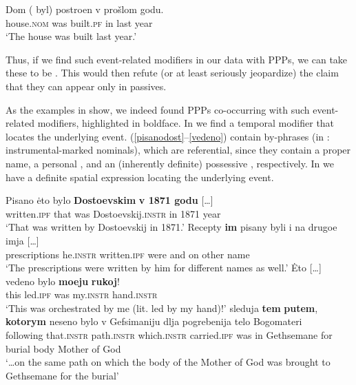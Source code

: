 \documentclass[output=paper,modfonts,newtxmath,hidelinks]{langscibook}
\begin{document}
\ea\gll	Dom (\hspace{-2pt} byl) postroen v prošlom godu.\\
	house.\textsc{nom} {} was built.\textsc{pf} in last year\\
\glt `The house was built last year.'\label{dom}
\z
	
\noindent Thus, if we find such event-related modifiers in our data with  PPPs, we can take these to be . This would then refute (or at least seriously jeopardize) the claim that they can appear only in  passives. 

As the examples in  show, we indeed found  PPPs co-occurring with such event-related modifiers, highlighted in boldface. In  we find a temporal modifier that locates the underlying event. (\ref{pisanodost}--\ref{vedeno}) contain by-phrases (in : instrumental-marked nominals), which are referential, since they contain a proper name, a personal , and an (inherently definite) possessive , respectively. In  we have a definite spatial expression locating the underlying event.

\ea\label{pisano}
\ea\gll	Pisano \.{e}to bylo \textbf{Dostoevskim} \textbf{v 1871 godu} [\dots]\\ 
	written.\textsc{ipf} that was Dostoevskij.\textsc{instr} {in 1871 year} \\
\glt	`That was written by Dostoevskij in 1871.'\label{pisanodost}
\ex\gll	Recepty \textbf{im} pisany byli i na drugoe imja [\dots]\\ 
	prescriptions he.\textsc{instr} written.\textsc{ipf} were and on other name \\ 
\glt	`The prescriptions were written by him for different names as well.'\label{pisanoim}
\ex\gll 	\.{E}to [\dots] vedeno bylo \textbf{moeju} \textbf{rukoj}!\\
	this {} led.\textsc{ipf} was my.\textsc{instr} hand.\textsc{instr}\\
\glt	`This was orchestrated by me (lit. led by my hand)!'\label{vedeno} 
\ex\gll	[\dots] sleduja \textbf{tem} \textbf{putem}, \textbf{kotorym} neseno bylo v Gefsimaniju dlja pogrebenija telo Bogomateri\\
	{} following that.\textsc{instr} path.\textsc{instr} which.\textsc{instr} carried.\textsc{ipf} was in Gethsemane for burial body {Mother of God} \\
\glt	`\dots on the same path on which the body of the Mother of God was brought to Gethsemane for the burial'\label{Sion}
\z\z
\end{document}
